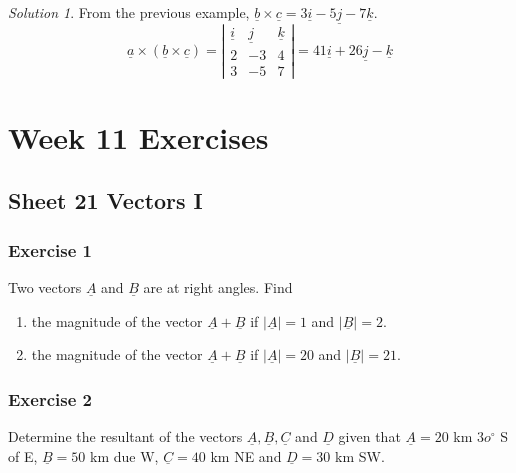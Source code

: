 \documentclass[
  11pt,
  oneside]{book}
\providecommand{\tightlist}{%
  \setlength{\itemsep}{0pt}\setlength{\parskip}{0pt}}
\newcommand{\slide}{}
\theoremstyle{definition}
\theoremstyle{definition}
\theoremstyle{definition}
\theoremstyle{definition}
\theoremstyle{remark}
\newtheorem*{solution}{Solution}
\begin{document}
\begin{solution}
From the previous example, \(\underline b \times\underline c = 3\underline i-5\underline j-7\underline k\).
\[
\underline a \times (\underline b \times\underline c) = \left|\begin{array}{ccc}\underline i&\underline j&\underline k\\2&-3&4\\3&-5&7\end{array}\right| = 41\underline i+26\underline j-\underline k
\]
\end{solution}

\chapter*{Week 11 Exercises}\label{week-11-exercises}

\section{Sheet 21 Vectors I}\label{sheet-21-vectors-i}

\subsection*{Exercise 1}\label{exercise-1-12}

Two vectors \(\underline A\) and \(\underline B\) are at right angles. Find

\begin{enumerate}
\def\labelenumi{\roman{enumi}.}
\tightlist
\item
  the magnitude of the vector \(\underline A+\underline B\) if \(|\underline A| = 1\) and \(|\underline B| = 2\).
\item
  the magnitude of the vector \(\underline A+\underline B\) if \(|\underline A|=20\) and \(|\underline B| = 21\).
\end{enumerate}

\slide

\subsection*{Exercise 2}\label{exercise-2-12}

Determine the resultant of the vectors \(\underline A, \underline B, \underline C\) and \(\underline D\) given that \(\underline A = 20\) km \(3o^\circ\) S of E, \(\underline B = 50\) km due W, \(\underline C = 40\) km NE and \(\underline D=30\) km SW.
\end{document}
